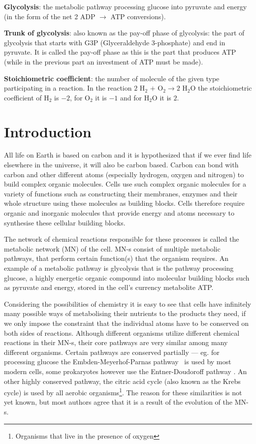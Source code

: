 \documentclass[a4paper,12pt]{article}
\begin{document}
\begin{framed}
	\textbf{Glycolysis}: the metabolic pathway processing glucose into pyruvate and energy (in the form of the net 2 ADP $\rightarrow$ ATP conversions).

	\textbf{Trunk of glycolysis}: also known as the pay-off phase of glycolysis: the part of glycolysis that starts with G3P (Glyceraldehyde 3-phosphate) and end in pyruvate. It is called the pay-off phase as this is the part that produces ATP (while in the previous part an investment of ATP must be made).
	
	\textbf{Stoichiometric coefficient}: the number of molecule of the given type participating in a reaction. In the reaction $2$ H$_2$ $+$ O$_2 \rightarrow 2$ H$_2$O the stoichiometric coefficient of H$_2$ is $-2$, for O$_2$ it is $-1$ and for H$_2$O it is $2$. 

	\end{framed}

	\newpage
	\section{Introduction}

	All life on Earth is based on carbon and it is hypothesized that if we ever find life elsewhere in the universe, it will also be carbon based. %
	Carbon can bond with carbon and other different atoms (especially hydrogen, oxygen and nitrogen) to build complex organic molecules. Cells use such complex organic molecules for a variety of functions such as constructing their membranes, enzymes and their whole structure using these molecules as building blocks. Cells therefore require organic and inorganic molecules that provide energy and atoms necessary to synthesise these cellular building blocks.

	The network of chemical reactions responsible for these processes is called the metabolic network (MN) of the cell. MN-s consist of multiple metabolic pathways, that perform certain function(s) that the organism requires. An example of a metabolic pathway is glycolysis that is the pathway processing glucose, a highly energetic organic compound into molecular building blocks such as pyruvate and energy, stored in the cell's currency metabolite ATP.
	
	Considering the possibilities of chemistry it is easy to see that cells have infinitely many possible ways of metabolising their nutrients to the products they need, if we only impose the constraint that the individual atoms have to be conserved on both sides of reactions. Although different organisms utilize different chemical reactions in their MN-s, their core pathways are very similar among many different organisms. Certain pathways are conserved partially --- eg. for processing glucose the Embden-Meyerhof-Parnas pathway \cite{EMPpathway}~is used by most modern cells, some prokaryotes however use the Entner-Doudoroff pathway \cite{EDpathway}. An other highly conserved pathway, the citric acid cycle (also known as the Krebs cycle) is used by all aerobic organisms\footnote{Organisms that live in the presence of oxygen}.
	The reason for these similarities is not yet known, but most authors agree that it is a result of the evolution of the MN-s. 
\end{document}
